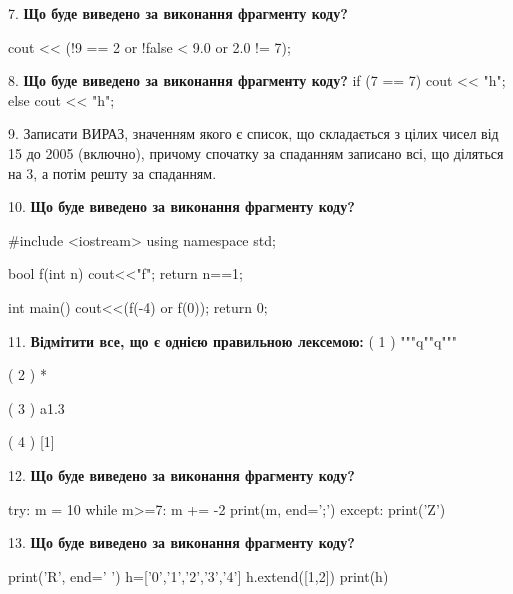 \documentclass[11pt]{article}
\begin{document}
7. \textbf{Що буде виведено за виконання фрагменту коду?}

cout << (!9 == 2 or !false < 9.0 or 2.0 != 7);
\par\vspace{5mm}

8. \textbf{Що буде виведено за виконання фрагменту коду?}
if (7 == 7)
    cout << "h";
else
    cout << "h";

\par\vspace{5mm}

9. 
Записати ВИРАЗ, значенням якого є список, що складається з цілих чисел від 15 до 2005 (включно), причому спочатку за спаданням записано всі, що діляться на 3, а потім решту за спаданням.\par\vspace{5mm}

10. \textbf{Що буде виведено за виконання фрагменту коду?}

#include <iostream>
using namespace std;

bool f(int n){
    cout<<"f";
    return n==1;
}

int main(){
    cout<<(f(-4) or f(0));
    return 0;
}
\par\vspace{5mm}

11. %
\textbf{Відмітити все, що є однією правильною лексемою:}
( 1 ) """q""q"""

( 2 ) *

( 3 ) a1.3

( 4 ) [1]
\par\vspace{5mm}

12. \textbf{Що буде виведено за виконання фрагменту коду?}

try:
    m = 10
    while m>=7:
        m += -2
    print(m, end=';')
except:
    print('Z')

\par\vspace{5mm}

13. \textbf{Що буде виведено за виконання фрагменту коду?}

print('R', end=' ')
h=['0','1','2','3','4']
h.extend([1,2])
print(h)

\par\vspace{5mm}
\end{document}

